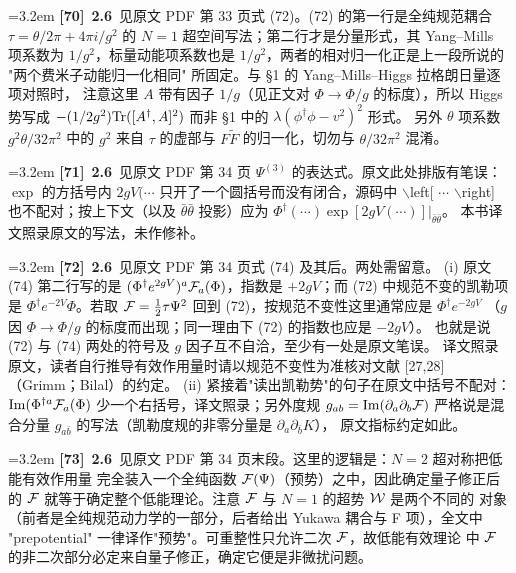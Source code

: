 \par
\par\medskip\noindent\hangindent=3.2em \textbf{[70]}~\textbf{2.6}~见原文 PDF 第 33 页式 (72)。(72) 的第一行是全纯规范耦合 $\tau=\theta/2\pi+4\pi i/g^2$ 的 $N=1$ 超空间写法；第二行才是分量形式，其 Yang--Mills 项系数为 $1/g^2$，标量动能项系数也是 $1/g^2$，两者的相对归一化正是上一段所说的 "两个费米子动能归一化相同" 所固定。与 §1 的 Yang--Mills--Higgs 拉格朗日量逐项对照时， 注意这里 $A$ 带有因子 $1/g$（见正文对 $\Phi\to\Phi/g$ 的标度），所以 Higgs 势写成 $-(1/2g^2){\rm Tr}([A^\dagger,A]^2)$ 而非 §1 中的 $\lambda(\phi^\dagger\phi-v^2)^2$ 形式。 另外 $\theta$ 项系数 $g^2\theta/32\pi^2$ 中的 $g^2$ 来自 $\tau$ 的虚部与 $F\widetilde F$ 的归一化，切勿与 $\theta/32\pi^2$ 混淆。
\par
\par\medskip\noindent\hangindent=3.2em \textbf{[71]}~\textbf{2.6}~见原文 PDF 第 34 页 $\Psi^{(3)}$ 的表达式。原文此处排版有笔误： $\exp$ 的方括号内 $2gV(\cdots$ 只开了一个圆括号而没有闭合，源码中 $\backslash$left[ $\cdots$ $\backslash$right] 也不配对；按上下文（以及 $\bar\theta\bar\theta$ 投影）应为 $\Phi^\dagger(\cdots)\exp[2gV(\cdots)]|_{\bar\theta\bar\theta}$。 本书译文照录原文的写法，未作修补。
\par
\par\medskip\noindent\hangindent=3.2em \textbf{[72]}~\textbf{2.6}~见原文 PDF 第 34 页式 (74) 及其后。两处需留意。 (i) 原文 (74) 第二行写的是 $(\Phi^\dagger e^{2gV})^a{\cal F}_a(\Phi)$，指数是 $+2gV$；而 (72) 中规范不变的凯勒项是 $\Phi^\dagger e^{-2V}\Phi$。若取 ${\cal F}=\frac12\tau\Psi^2$ 回到 (72)，按规范不变性这里通常应是 $\Phi^\dagger e^{-2gV}$ （$g$ 因 $\Phi\to\Phi/g$ 的标度而出现；同一理由下 (72) 的指数也应是 $-2gV$）。 也就是说 (72) 与 (74) 两处的符号及 $g$ 因子互不自洽，至少有一处是原文笔误。 译文照录原文，读者自行推导有效作用量时请以规范不变性为准核对文献 [27,28] （Grimm；Bilal）的约定。 (ii) 紧接着"读出凯勒势"的句子在原文中括号不配对：${\rm Im}(\Phi^{\dagger a}{\cal F}_a(\Phi)$ 少一个右括号，译文照录；另外度规 $g_{ab}={\rm Im}(\partial_a\partial_b{\cal F})$ 严格说是混合分量 $g_{a\bar b}$ 的写法（凯勒度规的非零分量是 $\partial_a\partial_{\bar b}K$）， 原文指标约定如此。
\par
\par\medskip\noindent\hangindent=3.2em \textbf{[73]}~\textbf{2.6}~见原文 PDF 第 34 页末段。这里的逻辑是：$N=2$ 超对称把低能有效作用量 完全装入一个全纯函数 ${\cal F}(\Psi)$（预势）之中，因此确定量子修正后的 ${\cal F}$ 就等于确定整个低能理论。注意 ${\cal F}$ 与 $N=1$ 的超势 ${\cal W}$ 是两个不同的 对象（前者是全纯规范动力学的一部分，后者给出 Yukawa 耦合与 F 项），全文中 "prepotential" 一律译作"预势"。可重整性只允许二次 ${\cal F}$，故低能有效理论 中 ${\cal F}$ 的非二次部分必定来自量子修正，确定它便是非微扰问题。
